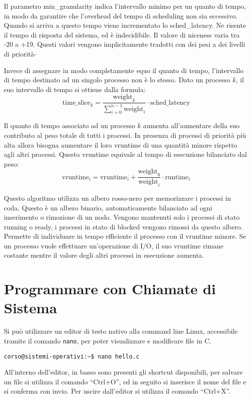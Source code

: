 \documentclass{article}
\numberwithin{equation}{subsection}
\begin{document}
Il parametro min\_granularity indica l'intervallo minimo per un quanto di tempo, in modo da garantire che l'overhead del tempo di scheduling non sia eccessivo. 
Quando si arriva a questo tempo viene incrementato lo sched\_latency. Ne risente il tempo di risposta del sistema, ed è indecidibile. Il valore di niceness varia 
tra -20 a +19. Questi valori vengono implicitamente tradotti con dei pesi a dei livelli di priorità- 

Invece di assegnare in modo completamente equo il quanto di tempo, l'intervallo di tempo destinato ad un singolo processo non è lo stesso. Dato un processo $k$, 
il suo intervallo di tempo si ottiene dalla formula:
\begin{equation}
    \mathrm{time\_slice}_k=\displaystyle\frac{\mathrm{weight}_k}{\displaystyle\sum_{i=0}^{n-1}\mathrm{weight}_i}\cdot\mathrm{sched\_latency}
\end{equation}

Il quanto di tempo associato ad un processo $k$ aumenta all'aumentare della suo contributo al peso totale di tutti i processi. In presenza di processi di priorità 
più alta allora bisogna aumentare il loro vruntime di una quantità minore rispetto agli altri processi. Questo vruntime equivale al tempo di esecuzione bilanciato dal 
peso:
\begin{equation}
    \mathrm{vruntime}_i=\mathrm{vruntime}_i+\displaystyle\frac{\mathrm{weight}_0}{\mathrm{weight}_i}\cdot\mathrm{runtime}_i
\end{equation}


Questo algoritmo utilizza un albero rosso-nero per memorizzare i processi in coda. Questo è un albero binario, automaticamente bilanciato ad ogni inserimento o 
rimozione di un nodo. Vengono mantenuti solo i processi di stato running o ready, i processi in stato di blocked vengono rimossi da questo albero. Permette di 
individuare in tempo efficiente il processo con il vruntime minore. 
Se un processo vuole effettuare un'operazione di I/O, il suo vruntime rimane costante mentre il valore degli altri processi in esecuzione aumenta. %

\clearpage

\section{Programmare con Chiamate di Sistema}

Si può utilizzare un editor di testo nativo alla command line Linux, accessibile tramite il comando \verb|nano|, per poter visualizzare e modificare file in C. 
\begin{verbatim}
corso@sistemi-operativi:~$ nano hello.c
\end{verbatim}
All'interno dell'editor, in basso sono presenti gli shortcut disponibili, per salvare un file si utilizza il comando ``Ctrl+O'', ed in seguito si inserisce il nome 
del file e si conferma con invio. Per uscire dall'editor si utilizza il comando ``Ctrl+X''. 
\end{document}
